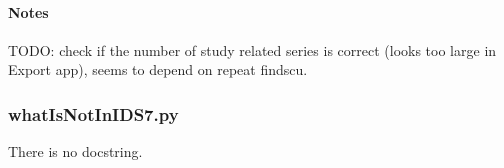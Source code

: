 \documentclass[letterpaper,10pt,english]{sphinxmanual}
\begin{document}
\paragraph{Notes}
\label{\detokenize{Architecture/scripts/whatIsInIDS7:notes}}
\sphinxAtStartPar
TODO: check if the number of study related series is correct (looks too large in Export app), seems to depend on \textendash{}repeat findscu.

\sphinxstepscope


\subsubsection{whatIsNotInIDS7.py}
\label{\detokenize{Architecture/scripts/whatIsNotInIDS7:whatisnotinids7-py}}\label{\detokenize{Architecture/scripts/whatIsNotInIDS7::doc}}
\sphinxAtStartPar
There is no docstring.
\end{document}
